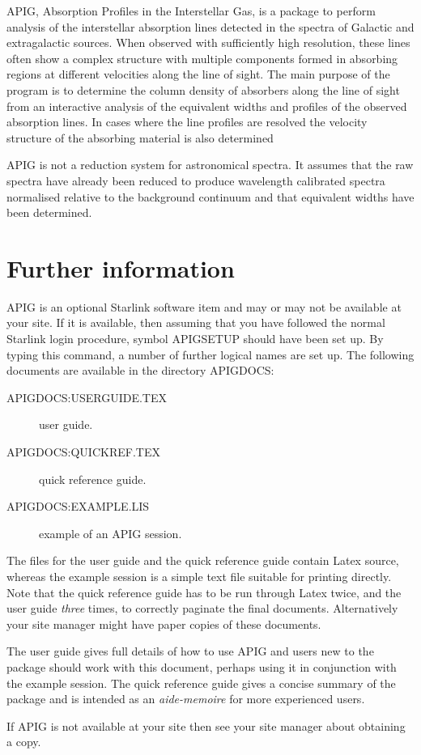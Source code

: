 APIG, Absorption Profiles in the Interstellar Gas, is a package to
perform analysis of the interstellar
absorption lines detected in the spectra of Galactic and extragalactic
sources. When observed with sufficiently high resolution, these lines
often show a complex structure with multiple components formed in
absorbing regions at different velocities along the line of sight. The
main purpose of the program is to determine the column density of
absorbers along the line of sight from an interactive analysis of the
equivalent widths and profiles of the observed absorption lines. In
cases where the line profiles are resolved the velocity structure
of the absorbing material is also determined

APIG is not a reduction system for astronomical spectra. It assumes
that the raw spectra have already been reduced to produce wavelength
calibrated spectra normalised relative to the background continuum and
that equivalent widths have been determined.

\section{Further information}

APIG is an optional Starlink software item and may or may not be
available at your site. If it is available, then assuming that you have
followed the normal Starlink login procedure, symbol APIGSETUP
should have been set up. By typing this command, a number of further logical
names are set up. The following documents are available in the directory
APIGDOCS:

\begin{description}

  \item [APIGDOCS:USERGUIDE.TEX] user guide.

  \item [APIGDOCS:QUICKREF.TEX] quick reference guide.

  \item [APIGDOCS:EXAMPLE.LIS] example of an APIG session.

\end{description}

The files for the user guide and the quick reference guide contain
Latex source, whereas the example session is a simple text file suitable
for printing directly. Note that the quick reference guide has to be run
through Latex twice, and the user guide {\em three} times, to correctly
paginate the final documents. Alternatively your site manager might
have paper copies of these documents.

The user guide gives full details of how to use APIG and users new to
the package should work with this document, perhaps using it in
conjunction with the example session. The quick reference guide gives
a concise summary of the package and is intended as an {\it
aide-memoire} for more experienced users.

If APIG is not available at your site then see your site manager about
obtaining a copy.


